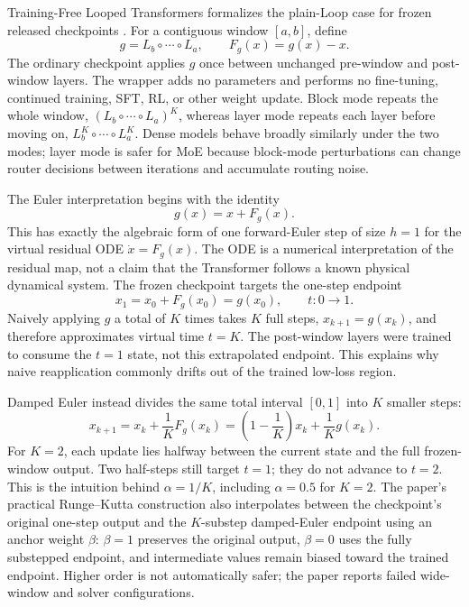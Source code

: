 \documentclass[10pt]{article}
\begin{document}
Training-Free Looped Transformers formalizes the plain-Loop case for frozen
released checkpoints \citep{chen2026looped}.  For a contiguous window
$[a,b]$, define
\begin{equation}
 g=L_b\circ\cdots\circ L_a,
 \qquad F_g(x)=g(x)-x.
\end{equation}
The ordinary checkpoint applies $g$ once between unchanged pre-window and
post-window layers.  The wrapper adds no parameters and performs no
fine-tuning, continued training, SFT, RL, or other weight update.  Block mode
repeats the whole window, $(L_b\circ\cdots\circ L_a)^K$, whereas layer mode
repeats each layer before moving on, $L_b^K\circ\cdots\circ L_a^K$.  Dense
models behave broadly similarly under the two modes; layer mode is safer for
MoE because block-mode perturbations can change router decisions between
iterations and accumulate routing noise.

The Euler interpretation begins with the identity
\begin{equation}
 g(x)=x+F_g(x).
\end{equation}
This has exactly the algebraic form of one forward-Euler step of size $h=1$
for the virtual residual ODE $\dot{x}=F_g(x)$.  The ODE is a numerical
interpretation of the residual map, not a claim that the Transformer follows a
known physical dynamical system.  The frozen checkpoint targets the one-step
endpoint
\begin{equation}
 x_1=x_0+F_g(x_0)=g(x_0),
 \qquad t:0\rightarrow1.
\end{equation}
Naively applying $g$ a total of $K$ times takes $K$ full steps,
$x_{k+1}=g(x_k)$, and therefore approximates virtual time $t=K$.  The
post-window layers were trained to consume the $t=1$ state, not this
extrapolated endpoint.  This explains why naive reapplication commonly drifts
out of the trained low-loss region.

Damped Euler instead divides the same total interval $[0,1]$ into $K$ smaller
steps:
\begin{equation}
 x_{k+1}=x_k+\frac{1}{K}F_g(x_k)
 =\left(1-\frac{1}{K}\right)x_k+\frac{1}{K}g(x_k).
 \label{eq:damped-loop}
\end{equation}
For $K=2$, each update lies halfway between the current state and the full
frozen-window output.  Two half-steps still target $t=1$; they do not advance
to $t=2$.  This is the intuition behind $\alpha=1/K$, including
$\alpha=0.5$ for $K=2$.  The paper's practical Runge--Kutta construction also
interpolates between the checkpoint's original one-step output and the
$K$-substep damped-Euler endpoint using an anchor weight $\beta$: $\beta=1$
preserves the original output, $\beta=0$ uses the fully substepped endpoint,
and intermediate values remain biased toward the trained endpoint.  Higher
order is not automatically safer; the paper reports failed wide-window and
solver configurations.
\end{document}
